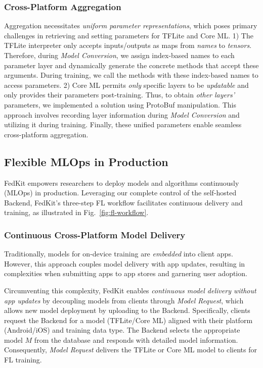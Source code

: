 \documentclass[conference]{IEEEtran}
\begin{document}
\subsubsection{Cross-Platform Aggregation}
Aggregation necessitates
\textit{uniform parameter representations},
which poses primary challenges in
retrieving and setting parameters for TFLite and Core ML.
1)
The TFLite interpreter only accepts inputs/outputs as maps from \textit{names} to
\textit{tensors}.
Therefore, during \textit{Model Conversion},
we assign index-based names to each parameter layer and
dynamically generate the concrete methods that accept these arguments.
During training, we call the methods with these index-based names to
access parameters.
2)
Core ML permits \textit{only} specific layers to be \textit{updatable} and
only provides their parameters post-training.
Thus, to obtain \textit{other layers'} parameters,
we implemented a solution using ProtoBuf manipulation.
This approach involves recording layer information
during \textit{Model Conversion} and
utilizing it during training.
Finally, these unified parameters enable seamless cross-platform aggregation.

\subsection{Flexible MLOps in Production}
\newcommand{\model}{$M$}
\newcommand{\fs}{$S_\mathrm F$}
FedKit empowers researchers to deploy models and algorithms continuously (MLOps)
in production.
Leveraging our complete control of the self-hosted Backend,
FedKit's three-step FL workflow
facilitates continuous delivery and training,
as illustrated in Fig.~\ref{fig:fl-workflow}.
\subsubsection{Continuous Cross-Platform Model Delivery}
Traditionally, models for on-device training are \textit{embedded} into client apps.
However, this approach couples model delivery with app updates,
resulting in complexities when submitting apps to app stores and garnering user adoption.

Circumventing this complexity,
FedKit enables \textit{continuous model delivery without app updates} by
decoupling models from clients through \textit{Model Request},
which allows new model deployment by uploading to the Backend.
Specifically, clients request the Backend for a model (TFLite/Core ML)
aligned with
their platform (Android/iOS) and training data type.
The Backend selects the appropriate model \model{} from the database and
responds with detailed model information.
Consequently, \textit{Model Request} delivers the TFLite or Core ML model
to clients for FL training.
\end{document}
